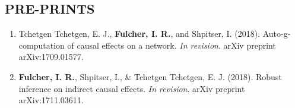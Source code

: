 \documentclass[12pt]{article}
\begin{document}
\subsection*{\textbf{PRE-PRINTS}}

\begin{enumerate}
	\item Tchetgen Tchetgen, E. J., \textbf{Fulcher, I. R.}, and Shpitser, I. (2018). Auto-g-computation of causal effects on a network. \textit{In revision}. arXiv preprint arXiv:1709.01577. 
	
	\item \textbf{Fulcher, I. R.}, Shpitser, I., \& Tchetgen Tchetgen, E. J. (2018). Robust inference on indirect causal effects.  \textit{In revision}. arXiv preprint arXiv:1711.03611. 
\end{enumerate}






\end{document}
